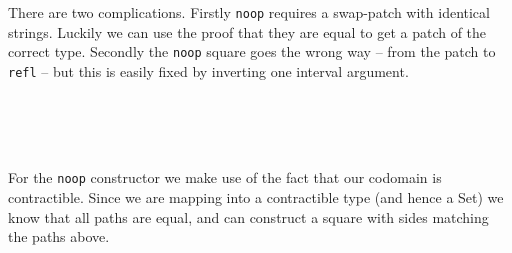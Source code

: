There are two complications. Firstly \texttt{noop} requires a swap-patch with identical strings.
Luckily we can use the proof that they are equal to get a patch of the correct type.
Secondly the \texttt{noop} square goes the wrong way -- from the patch to \texttt{refl} --
but this is easily fixed by inverting one interval argument.
\begin{code}%
\>[0]\AgdaSpace{}%
\AgdaSpace{}%
\AgdaSpace{}%
\AgdaSpace{}%
\AgdaSpace{}%
\AgdaSymbol{)}\AgdaSpace{}%
\AgdaSymbol{)}\AgdaSpace{}%
\AgdaSpace{}%
\AgdaSpace{}%
\AgdaSpace{}%
\<%
\\
\>[0]%
\>[26]\AgdaSymbol{|}\AgdaSpace{}%
\AgdaSpace{}%
%
\>[864I]\AgdaSymbol{=}\AgdaSpace{}%
\<%
\\
\>[.][@{}l@{}]\<[864I]%
\>[38]\AgdaOperator{\AgdaInductiveConstructor{,}}\AgdaSpace{}%
\AgdaSpace{}%
\AgdaSpace{}%
\AgdaSpace{}%
\AgdaSymbol{((}\AgdaSpace{}%
\AgdaSymbol{(}\AgdaSpace{}%
\AgdaSpace{}%
\AgdaSpace{}%
\AgdaSymbol{)}\AgdaSpace{}%
\AgdaSymbol{(}\AgdaSpace{}%
\AgdaSymbol{)}\AgdaSpace{}%
\AgdaSpace{}%
\AgdaSpace{}%
\AgdaSpace{}%
\AgdaSymbol{)}\AgdaSpace{}%
\AgdaSymbol{(}\AgdaOperator{\AgdaPrimitive{\textasciitilde{}}}\AgdaSpace{}%
\AgdaSymbol{)}\AgdaSpace{}%
\AgdaSymbol{)}\<%
\\
\>[0]%
\>[26]\AgdaSymbol{|}\AgdaSpace{}%
\AgdaSpace{}%
\AgdaSymbol{\AgdaUnderscore{}}\AgdaSpace{}%
\AgdaSymbol{=}\AgdaSpace{}%
\AgdaSpace{}%
\AgdaOperator{\AgdaInductiveConstructor{,}}\AgdaSpace{}%
\<%
\end{code}

For the \texttt{noop} constructor we make use of the fact that our codomain is
contractible. Since we are mapping into a contractible type (and hence a Set) we know
that all paths are equal, and can construct a square with sides matching the paths above.

